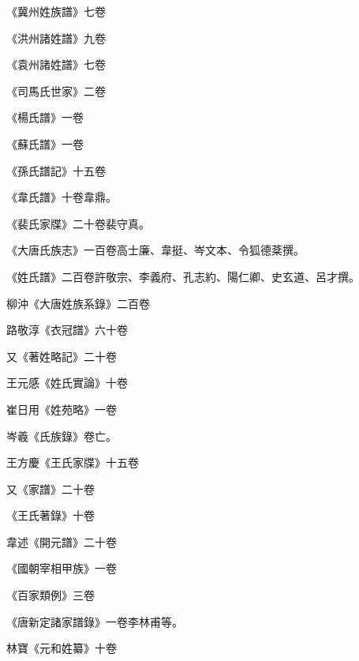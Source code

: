 \begin{pinyinscope}
 《冀州姓族譜》七卷



 《洪州諸姓譜》九卷



 《袁州諸姓譜》七卷



 《司馬氏世家》二卷



 《楊氏譜》一卷



 《蘇氏譜》一卷



 《孫氏譜記》十五卷



 《韋氏譜》十卷韋鼎。



 《裴氏家牒》二十卷裴守真。



 《大唐氏族志》一百卷高士廉、韋挺、岑文本、令狐德棻撰。



 《姓氏譜》二百卷許敬宗、李義府、孔志約、陽仁卿、史玄道、呂才撰。



 柳沖《大唐姓族系錄》二百卷



 路敬淳《衣冠譜》六十卷



 又《著姓略記》二十卷



 王元感《姓氏實論》十卷



 崔日用《姓苑略》一卷



 岑羲《氏族錄》卷亡。



 王方慶《王氏家牒》十五卷



 又《家譜》二十卷



 《王氏著錄》十卷



 韋述《開元譜》二十卷



 《國朝宰相甲族》一卷



 《百家類例》三卷



 《唐新定諸家譜錄》一卷李林甫等。



 林寶《元和姓纂》十卷




\end{pinyinscope}
